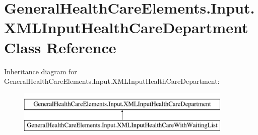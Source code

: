 \hypertarget{class_general_health_care_elements_1_1_input_1_1_x_m_l_input_health_care_department}{}\section{General\+Health\+Care\+Elements.\+Input.\+X\+M\+L\+Input\+Health\+Care\+Department Class Reference}
\label{class_general_health_care_elements_1_1_input_1_1_x_m_l_input_health_care_department}
Inheritance diagram for General\+Health\+Care\+Elements.\+Input.\+X\+M\+L\+Input\+Health\+Care\+Department\+:\begin{figure}[H]
\begin{center}
\leavevmode
\includegraphics[height=2.000000cm]{class_general_health_care_elements_1_1_input_1_1_x_m_l_input_health_care_department}
\end{center}
\end{figure}
